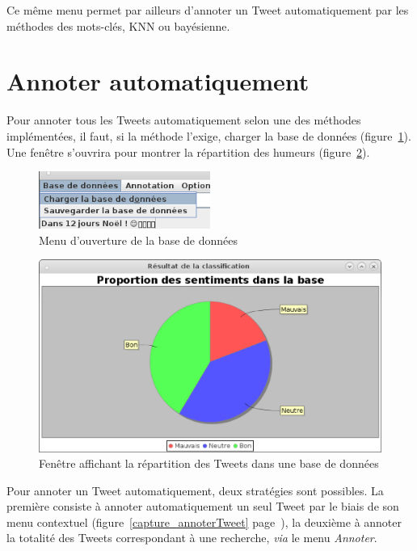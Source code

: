 \documentclass[12pt,a4paper]{report}
\begin{document}
Ce même menu permet par ailleurs d'annoter un Tweet automatiquement par les
méthodes des mots-clés, KNN ou bayésienne.

\section{Annoter automatiquement}
Pour annoter tous les Tweets automatiquement selon une des méthodes
implémentées, il faut, si la méthode l'exige, charger la base de données
(figure~\ref{capture_ouvrir_base_de_donnees}). Une fenêtre s'ouvrira pour
montrer la répartition des humeurs (figure~\ref{capture_repartition_Tweetsv6}).

\begin{figure}
	\centering
	\includegraphics[width=0.5\textwidth]{img/chargerbdd.png}
	\caption{Menu d'ouverture de la base de données}
\label{capture_ouvrir_base_de_donnees}
\end{figure}

\begin{figure}
	\centering
	\includegraphics[width=\textwidth]{img/resultats_classification_tweetsv6.eps}
	\caption{Fenêtre affichant la répartition des Tweets dans une base de
	données}
\label{capture_repartition_Tweetsv6}
\end{figure}


Pour annoter un Tweet automatiquement, deux stratégies sont possibles.
La première consiste à annoter automatiquement un seul Tweet par le biais de son
menu contextuel (figure~\ref{capture_annoterTweet}
page~\pageref{capture_annoterTweet}), la deuxième à annoter la
totalité des Tweets correspondant à une recherche, \textit{via} le menu
\textit{Annoter}.
\end{document}
